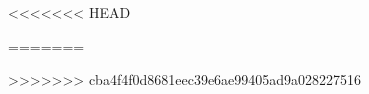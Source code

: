 \documentclass[11pt,a4paper]{article}
\begin{document}
	
	\pagestyle{fancy}
	
	
<<<<<<< HEAD
	
	
=======
	
>>>>>>> cba4f4f0d8681eec39e6ae99405ad9a028227516
	
	
\end{document}
